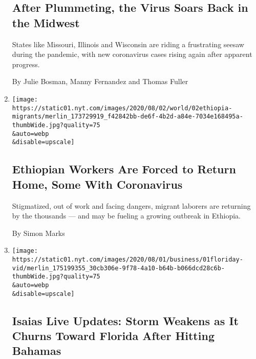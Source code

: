 \begin{enumerate}
  \hypertarget{after-plummeting-the-virus-soars-back-in-the-midwest}{%
  \subsection{After Plummeting, the Virus Soars Back in the
  Midwest}\label{after-plummeting-the-virus-soars-back-in-the-midwest}}

  States like Missouri, Illinois and Wisconsin are riding a frustrating
  seesaw during the pandemic, with new coronavirus cases rising again
  after apparent progress.

  By Julie Bosman, Manny Fernandez and Thomas Fuller
\item
  \href{/2020/08/01/world/africa/ethiopian-migrant-workers-coronavirus.html}{}

  \texttt{[image: https://static01.nyt.com/images/2020/08/02/world/02ethiopia-migrants/merlin\_173729919\_f42842bb-de6f-4b2d-a84e-7034e168495a-thumbWide.jpg?quality=75\\\&auto=webp\\\&disable=upscale]}

  \hypertarget{ethiopian-workers-are-forced-to-return-home-some-with-coronavirus}{%
  \subsection{Ethiopian Workers Are Forced to Return Home, Some With
  Coronavirus}\label{ethiopian-workers-are-forced-to-return-home-some-with-coronavirus}}

  Stigmatized, out of work and facing dangers, migrant laborers are
  returning by the thousands --- and may be fueling a growing outbreak
  in Ethiopia.

  By Simon Marks
\item
  \href{/2020/08/01/us/hurricane-isaias-track.html}{}

  \texttt{[image: https://static01.nyt.com/images/2020/08/01/business/01floriday-vid/merlin\_175199355\_30cb306e-9f78-4a10-b64b-b066dcd28c6b-thumbWide.jpg?quality=75\\\&auto=webp\\\&disable=upscale]}

  \hypertarget{isaias-live-updates-storm-weakens-as-it-churns-toward-florida-after-hitting-bahamas}{%
  \subsection{Isaias Live Updates: Storm Weakens as It Churns Toward
  Florida After Hitting
  Bahamas}\label{isaias-live-updates-storm-weakens-as-it-churns-toward-florida-after-hitting-bahamas}}


\end{enumerate}
